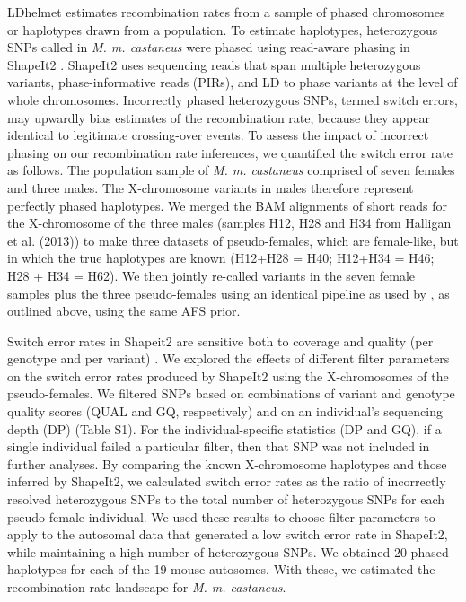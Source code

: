 LDhelmet estimates recombination rates from a sample of phased chromosomes or haplotypes drawn from a population. To estimate haplotypes, heterozygous SNPs called in \emph{M. m. castaneus} were phased using read-aware phasing in ShapeIt2 \citep{RN231}. ShapeIt2 uses sequencing reads that span multiple heterozygous variants, phase-informative reads (PIRs), and LD to phase variants at the level of whole chromosomes. Incorrectly phased heterozygous SNPs, termed switch errors, may upwardly bias estimates of the recombination rate, because they appear identical to legitimate crossing-over events. To assess the impact of incorrect phasing on our recombination rate inferences, we quantified the switch error rate as follows. The population sample of \emph{M. m. castaneus} comprised of seven females and three males. The X-chromosome variants in males therefore represent perfectly phased haplotypes. We merged the BAM alignments of short reads for the X-chromosome of the three males (samples H12, H28 and H34 from Halligan et al. (2013)) to make three datasets of pseudo-females, which are female-like, but in which the true haplotypes are known (H12+H28 = H40; H12+H34 = H46; H28 + H34 = H62). We then jointly re-called variants in the seven female samples plus the three pseudo-females using an identical pipeline as used by \cite{RN122}, as outlined above, using the same AFS prior.
 
Switch error rates in Shapeit2 are sensitive both to coverage and quality (per genotype and per variant) \citep{RN231}. We explored the effects of different filter parameters on the switch error rates produced by ShapeIt2 using the X-chromosomes of the pseudo-females. We filtered SNPs based on combinations of variant and genotype quality scores (QUAL and GQ, respectively) and on an individual’s sequencing depth (DP) (Table S1). For the individual-specific statistics (DP and GQ), if a single individual failed a particular filter, then that SNP was not included in further analyses. By comparing the known X-chromosome haplotypes and those inferred by ShapeIt2, we calculated switch error rates as the ratio of incorrectly resolved heterozygous SNPs to the total number of heterozygous SNPs for each pseudo-female individual. We used these results to choose filter parameters to apply to the autosomal data that generated a low switch error rate in ShapeIt2, while maintaining a high number of heterozygous SNPs. We obtained 20 phased haplotypes for each of the 19 mouse autosomes. With these, we estimated the recombination rate landscape for \emph{M. m. castaneus}.
 
